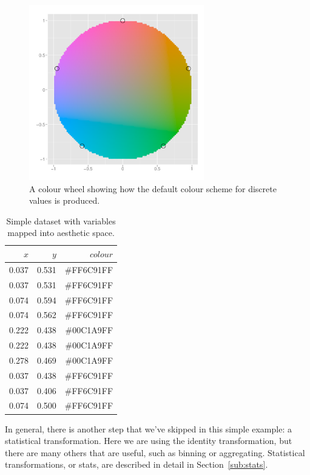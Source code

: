 \begin{figure}[htbp]
  \centering
    \includegraphics[width=3in]{colour-wheel.pdf}
  \caption{A colour wheel showing how the default colour scheme for discrete values is produced.}
  \label{fig:colour-wheel}
\end{figure}


\begin{table}[ht]
  \begin{center}
  \begin{tabular}{rrr}
    \toprule
    $x$ & $y$ & $colour$\\
    \midrule
    0.037 & 0.531 & \#FF6C91FF\\
    0.037 & 0.531 & \#FF6C91FF\\
    0.074 & 0.594 & \#FF6C91FF\\
    0.074 & 0.562 & \#FF6C91FF\\
    0.222 & 0.438 & \#00C1A9FF\\
    0.222 & 0.438 & \#00C1A9FF\\
    0.278 & 0.469 & \#00C1A9FF\\
    0.037 & 0.438 & \#FF6C91FF\\
    0.037 & 0.406 & \#FF6C91FF\\
    0.074 & 0.500 & \#FF6C91FF\\
    \bottomrule
  \end{tabular}
  \end{center}
  \caption{Simple dataset with variables mapped into aesthetic space.}
  \label{tbl:scaled}
\end{table}

In general, there is another step that we've skipped in this simple example: a statistical transformation.  Here we are using the identity transformation, but there are many others that are useful, such as binning or aggregating.  Statistical transformations, or stats, are described in detail in Section~\ref{sub:stats}.

